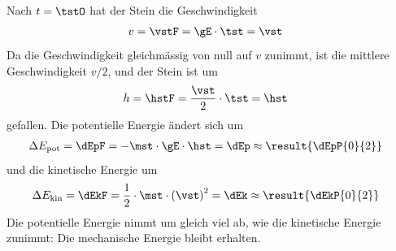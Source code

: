 Nach $t = \tstO$ hat der Stein die Geschwindigkeit
\begin{align}
 v &= \vstF = \gE\cdot\tst = \vst
\end{align}
Da die Geschwindigkeit gleichmässig von null auf $v$ zunimmt, ist die mittlere Geschwindigkeit $v/2$, und der Stein ist um
\begin{align}
 h &= \hstF = \frac{\vst}{2}\cdot\tst = \hst
\end{align}
gefallen. Die potentielle Energie ändert sich um
\begin{align}
 \Delta E_\mathrm{pot} &= \dEpF = -\mst\cdot\gE\cdot\hst = \dEp \approx \result{\dEpP{0}{2}}
\end{align}
und die kinetische Energie um
\begin{align}
 \Delta E_\mathrm{kin} &= \dEkF = \frac{1}{2}\cdot\mst\cdot\left(\vst\right)^2 = \dEk \approx \result{\dEkP{0}{2}}
\end{align}
Die potentielle Energie nimmt um gleich viel ab, wie die kinetische Energie zunimmt: Die mechanische Energie bleibt erhalten.
